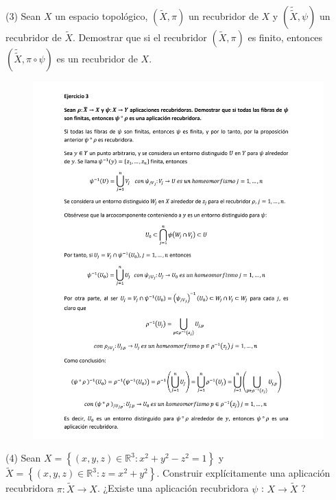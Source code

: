 \documentclass[
  a4paper,
  spanish,
  12pt,
]{scrartcl}
\begin{document}
\newpage

\begin{ejer}
(3) Sean $X$ un espacio topológico, $(\widetilde{X}, \pi)$ un recubridor de $X$ y $(\widetilde{\widetilde{X}}, \psi)$ un recubridor de $\widetilde{X}$. Demostrar que si el recubridor $(\widetilde{X}, \pi)$ es finito, entonces $(\widetilde{\widetilde{X}}, \pi \circ \psi)$ es un recubridor de $X$.\\
\end{ejer}

\begin{figure}[h]
    \centering
    \includegraphics[width=\textwidth]{ej3.png}
    \label{fig:etiqueta}
\end{figure}

\newpage

\begin{ejer}
(4) Sean $X=\left\{(x, y, z) \in \mathbb{R}^{3}: x^{2}+y^{2}-z^{2}=1\right\}$ y $\widetilde{X}=\left\{(x, y, z) \in \mathbb{R}^{3}: z=x^{2}+y^{2}\right\}$. Construir explícitamente una aplicación recubridora $\pi: \widetilde{X} \rightarrow X$. ¿Existe una aplicación recubridora $\psi$ : $X \rightarrow \widetilde{X}$ ?\\
\end{ejer}
\end{document}
